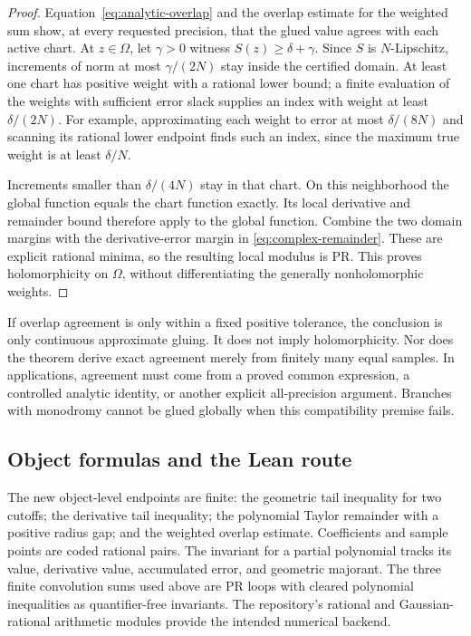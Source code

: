 \begin{proof}
Equation~\eqref{eq:analytic-overlap} and the overlap estimate for the weighted sum show, at every requested precision, that the glued value agrees with each active chart. At \(z\in\Omega\), let \(\gamma>0\) witness \(S(z)\geq\delta+\gamma\). Since \(S\) is \(N\)-Lipschitz, increments of norm at most \(\gamma/(2N)\) stay inside the certified domain. At least one chart has positive weight with a rational lower bound; a finite evaluation of the weights with sufficient error slack supplies an index with weight at least \(\delta/(2N)\). For example, approximating each weight to error at most \(\delta/(8N)\) and scanning its rational lower endpoint finds such an index, since the maximum true weight is at least \(\delta/N\).

Increments smaller than \(\delta/(4N)\) stay in that chart. On this neighborhood the global function equals the chart function exactly. Its local derivative and remainder bound therefore apply to the global function. Combine the two domain margins with the derivative-error margin in \eqref{eq:complex-remainder}. These are explicit rational minima, so the resulting local modulus is PR. This proves holomorphicity on \(\Omega\), without differentiating the generally nonholomorphic weights.
\end{proof}

If overlap agreement is only within a fixed positive tolerance, the conclusion is only continuous approximate gluing. It does not imply holomorphicity. Nor does the theorem derive exact agreement merely from finitely many equal samples. In applications, agreement must come from a proved common expression, a controlled analytic identity, or another explicit all-precision argument. Branches with monodromy cannot be glued globally when this compatibility premise fails.

\subsection{Object formulas and the Lean route}

The new object-level endpoints are finite: the geometric tail inequality for two cutoffs; the derivative tail inequality; the polynomial Taylor remainder with a positive radius gap; and the weighted overlap estimate. Coefficients and sample points are coded rational pairs. The invariant for a partial polynomial tracks its value, derivative value, accumulated error, and geometric majorant. The three finite convolution sums used above are PR loops with cleared polynomial inequalities as quantifier-free invariants. The repository's rational and Gaussian-rational arithmetic modules provide the intended numerical backend.

